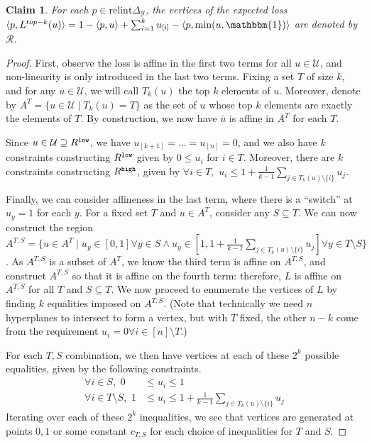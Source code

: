 \documentclass[12pt]{article}
\newcommand{\reals}{\mathbb{R}}
\newcommand{\simplex}{\Delta_\Y}
\newcommand{\R}{\mathcal{R}}
\newcommand{\U}{\mathcal{U}}
\newcommand{\Y}{\mathcal{Y}}
\newcommand{\inprod}[2]{\langle #1, #2 \rangle}%
\newcommand{\ones}{\mathbbm{1}}
\newtheorem{claim}{Claim}
\begin{document}
\begin{claim}
	For each $p \in \mathrm{relint}\simplex$, the vertices of the expected loss $\inprod{p}{L^{top-k}(u)} = 1 - \inprod{p}{u} + \sum_{i=1}^k u_{[i]} - \inprod{p}{\min(u,\ones)}$ are denoted by $\R$.
\end{claim}
\begin{proof}
	First, observe the loss is affine in the first two terms for all $u \in \U$, and non-linearity is only introduced in the last two terms.
	Fixing a set $T$ of size $k$, and for any $u \in \U$, we will call $T_k(u)$ the top $k$ elements of $u$.
	Moreover, denote by $A^T = \{u \in \U \mid T_k(u) = T\}$ as the set of $u$ whose top $k$ elements are exactly the elements of $T$.
	By construction, we now have $\bar u$ is affine in $A^T$ for each $T$.
	 
	Since $u \in \U \supseteq R^{\tt low}$, we have $u_{[k+1]} = \ldots = u_{[n]} = 0$, and we also have $k$ constraints constructing $R^{\tt low}$ given by $0 \leq u_{i}$ for $i \in T$.	
	Moreover, there are $k$ constraints constructing $R^{\tt high}$, given by $\forall i \in T, \,\,
	u_{i} \leq 1 + \frac{1}{k-1}\sum_{j \in T_k(u) \setminus \{i\}} u_j$.


	Finally, we can consider affineness in the last term, where there is a ``switch'' at $u_y = 1$ for each $y$.
	For a fixed set $T$ and $u \in A^T$, consider any $S \subseteq T$.
	We can now construct the region $A^{T,S} = \{u \in A^T \mid u_y \in [0,1] \forall y \in S \wedge u_y \in [1,1 + \frac 1 {k-1} \sum_{j \in T_k(u) \setminus \{i\}} u_j] \forall y \in T \setminus S \}$.
	As $A^{T,S}$ is a subset of $A^T$, we know the third term is affine on $A^{T,S}$, and construct $A^{T,S}$ so that it is affine on the fourth term: therefore, $L$ is affine on $A^{T,S}$ for all $T$ and $S \subseteq T$. 
	We now proceed to enumerate the vertices of $L$ by finding $k$ equalities imposed on $A^{T,S}$.
	(Note that technically we need $n$ hyperplanes to intersect to form a vertex, but with $T$ fixed, the other $n-k$ come from the requirement $u_i = 0 \forall i \in [n] \setminus T$.)
	
	For each $T,S$ combination, we then have vertices at each of these $2^k$ possible equalities, given by the following constraints.
	\begin{align*}
	\forall i \in S, \,\, 0 &\leq u_i \leq 1 \\
	\forall i \in T \setminus S, \,\, 1 &\leq u_i \leq 1 + \frac 1 {k-1} \sum_{j \in T_k(u) \setminus \{i\}} u_j 
	\end{align*}
	Iterating over each of these $2^k$ inequalities, we see that vertices are generated at points $0,1$ or some constant $c_{T,S}$ for each choice of inequalities for $T$ and $S$.


\end{proof}
\end{document}
